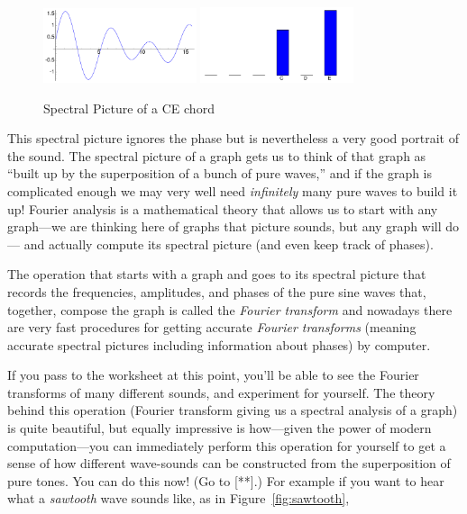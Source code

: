 \documentclass[11pt]{article}
\theoremstyle{plain}
\theoremstyle{definition}
\numberwithin{equation}{section}
\numberwithin{figure}{section}
\numberwithin{table}{section}
\begin{document}
\begin{figure}[htbp]
\begin{center}
\includegraphics[width=0.4\textwidth]{illustrations/sound-ce-general_sum}
\includegraphics[width=0.4\textwidth]{illustrations/sound-ce-general_sum-blips}
\end{center}
\caption{Spectral Picture of a CE chord\label{fig:ce-spectral}}
\end{figure}

This spectral picture ignores the phase but is nevertheless a very
good portrait of the sound.  The spectral picture of a graph gets us
to think of that graph as ``built up by the superposition of a bunch
of pure waves,'' and if the graph is complicated enough we may very well
need {\em infinitely} many pure waves to build it up!  Fourier analysis is a
mathematical theory that allows us to start with any graph---we are
thinking here of graphs that picture sounds, but any graph will do---
and actually compute its spectral picture (and even keep track of
phases).
 
 
The operation that starts with a graph and goes to its spectral
picture that records the frequencies, amplitudes, and phases of the
pure sine waves that, together, compose the graph is called the {\em
  Fourier transform} and nowadays there are very fast procedures for
getting accurate {\em Fourier transforms} (meaning accurate spectral
pictures including information about phases) by computer.
 
 
If you pass to the worksheet at this point, you'll be able to see the
Fourier transforms of many different sounds, and experiment for
yourself.  The theory behind this operation (Fourier transform giving
us a spectral analysis of a graph) is quite beautiful, but equally
impressive is how---given the power of modern computation---you can
immediately perform this operation for yourself to get a sense of how
different wave-sounds can be constructed from the superposition of
pure tones.  You can do this now!  (Go to [**].)  For example if you
want to hear what a {\em sawtooth} wave sounds like, as in
Figure~\ref{fig:sawtooth}, 
   
\end{document}

